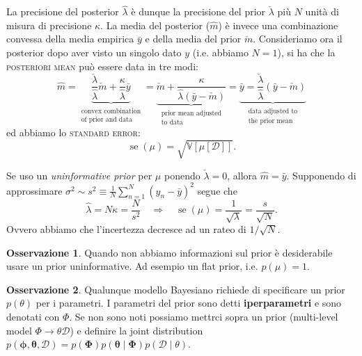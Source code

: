 \documentclass[10pt]{article}
\renewcommand{\vec}[1]{\boldsymbol{#1}}
\newcommand{\im}[1]{\textsc{#1}}
\newcommand{\cond}{\mid}
\theoremstyle{definition}
\newtheorem{observation}{Osservazione}[subsection]
\begin{document}
    La precisione del posterior \(\hat{\lambda}\) è dunque la precisione del prior \(\check{\lambda}\)
    più \(N\) unità di misura di precisione \(\kappa\). La media del posterior (\(\hat{m}\)) è invece
    una combinazione convessa della media empirica $\bar{y}$ e della media del prior \(\check{m}\).
    Consideriamo ora il posterior dopo aver visto un singolo dato \(y\) (i.e. abbiamo \(N = 1\)),
    si ha che la \im{posteriori mean} può essere data in tre modi:
    \begin{equation}
        \hat{m} = \underbrace{\frac{\check{\lambda}}{\hat{\lambda}}\check{m} + \frac{\kappa}{\hat{\lambda}}\bar{y}}_{\substack{\text{convex combination}\\ \text{of prior and data}}}
        = \underbrace{\check{m} + \frac{\kappa}{\hat{\lambda} \left( \bar{y} - \check{m} \right)}}_{\substack{\text{prior mean adjusted}\\ \text{to data}}}
        = \underbrace{\bar{y} = \frac{\check{\lambda}}{\hat{\lambda}}\left( \bar{y} - \check{m} \right)}_{\substack{\text{data adjusted to} \\ \text{the prior mean}}}
    \end{equation}
    ed abbiamo lo \im{standard error}:
    \begin{equation}
        \operatorname{se} \left( \mu \right) = \sqrt{\mathbb{V}\left[ \mu \left[ \mathcal{D} \right] \right]}.
    \end{equation}

    Se uso un \textit{uninformative prior} per \(\mu\) ponendo \(\check{\lambda} = 0\), allora \(\hat{m} = \bar{y}\).
    Supponendo di approssimare \(\sigma^2 \sim s^2 \equiv \frac{1}{N}\sum_{n=1}^N \left( y_n - \bar{y} \right)^2\) segue che
    \begin{equation}
        \hat{\lambda} = N\kappa = \frac{N}{s^2} \quad \Longrightarrow \quad \operatorname{se} \left( \mu \right) = \frac{1}{\sqrt{\lambda}} = \frac{s}{\sqrt{N}}.
    \end{equation}
    Ovvero abbiamo che l'incertezza decresce ad un rateo di \(1/\sqrt{N}\).

    \begin{observation}
        Quando non abbiamo informazioni sul prior è desiderabile usare un prior uninformative.
        Ad esempio un flat prior, i.e. \(p \left( \mu \right) = 1 \).
    \end{observation}

    \begin{observation}
        Qualunque modello Bayesiano richiede di specificare un prior \(p \left( \theta \right)\) per i parametri.
        I parametri del prior sono detti \textbf{iperparametri} e sono denotati con \(\Phi\). Se non
        sono noti possiamo mettrci sopra un prior (multi-level model \(\Phi\rightarrow\theta\mathcal{D}\)) e
        definire la joint distribution \(p \left( \vec{\phi}, \vec{\theta}, \mathcal{D} \right) = p \left( \vec{\Phi} \right) p \left( \vec{\theta} \cond \vec{\Phi}\right) p \left( \mathcal{D} \cond \theta \right)\).
    \end{observation}
\end{document}

